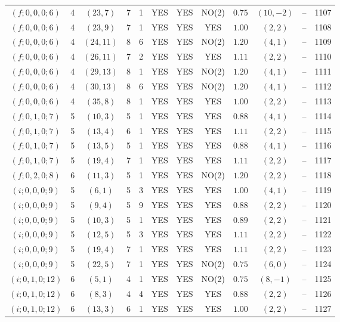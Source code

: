 \begin{longtable}{|c|c|c|c|c|c|c|c|c|c|c|c|}
$(f;0,0,0;6)$ & 4 & $(23,7)$ & 7 & 1 & YES & YES & NO(2) & $0.75$ & $(10,-2)$ & -- & 1107\\
$(f;0,0,0;6)$ & 4 & $(23,9)$ & 7 & 1 & YES & YES & YES & $1.00$ & $(2,2)$ & -- & 1108\\
$(f;0,0,0;6)$ & 4 & $(24,11)$ & 8 & 6 & YES & YES & NO(2) & $1.20$ & $(4,1)$ & -- & 1109\\
$(f;0,0,0;6)$ & 4 & $(26,11)$ & 7 & 2 & YES & YES & YES & $1.11$ & $(2,2)$ & -- & 1110\\
$(f;0,0,0;6)$ & 4 & $(29,13)$ & 8 & 1 & YES & YES & NO(2) & $1.20$ & $(4,1)$ & -- & 1111\\
$(f;0,0,0;6)$ & 4 & $(30,13)$ & 8 & 6 & YES & YES & NO(2) & $1.20$ & $(4,1)$ & -- & 1112\\
$(f;0,0,0;6)$ & 4 & $(35,8)$ & 8 & 1 & YES & YES & YES & $1.00$ & $(2,2)$ & -- & 1113\\
$(f;0,1,0;7)$ & 5 & $(10,3)$ & 5 & 1 & YES & YES & YES & $0.88$ & $(4,1)$ & -- & 1114\\
$(f;0,1,0;7)$ & 5 & $(13,4)$ & 6 & 1 & YES & YES & YES & $1.11$ & $(2,2)$ & -- & 1115\\
$(f;0,1,0;7)$ & 5 & $(13,5)$ & 5 & 1 & YES & YES & YES & $0.88$ & $(4,1)$ & -- & 1116\\
$(f;0,1,0;7)$ & 5 & $(19,4)$ & 7 & 1 & YES & YES & YES & $1.11$ & $(2,2)$ & -- & 1117\\
$(f;0,2,0;8)$ & 6 & $(11,3)$ & 5 & 1 & YES & YES & NO(2) & $1.20$ & $(2,2)$ & -- & 1118\\
$(i;0,0,0;9)$ & 5 & $(6,1)$ & 5 & 3 & YES & YES & YES & $1.00$ & $(4,1)$ & -- & 1119\\
$(i;0,0,0;9)$ & 5 & $(9,4)$ & 5 & 9 & YES & YES & YES & $0.88$ & $(2,2)$ & -- & 1120\\
$(i;0,0,0;9)$ & 5 & $(10,3)$ & 5 & 1 & YES & YES & YES & $0.89$ & $(2,2)$ & -- & 1121\\
$(i;0,0,0;9)$ & 5 & $(12,5)$ & 5 & 3 & YES & YES & YES & $1.11$ & $(2,2)$ & -- & 1122\\
$(i;0,0,0;9)$ & 5 & $(19,4)$ & 7 & 1 & YES & YES & YES & $1.11$ & $(2,2)$ & -- & 1123\\
$(i;0,0,0;9)$ & 5 & $(22,5)$ & 7 & 1 & YES & YES & NO(2) & $0.75$ & $(6,0)$ & -- & 1124\\
$(i;0,1,0;12)$ & 6 & $(5,1)$ & 4 & 1 & YES & YES & NO(2) & $0.75$ & $(8,-1)$ & -- & 1125\\
$(i;0,1,0;12)$ & 6 & $(8,3)$ & 4 & 4 & YES & YES & YES & $0.88$ & $(2,2)$ & -- & 1126\\
$(i;0,1,0;12)$ & 6 & $(13,3)$ & 6 & 1 & YES & YES & YES & $1.00$ & $(2,2)$ & -- & 1127\\

\end{longtable}
